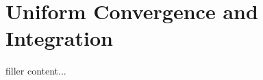 \section{Uniform Convergence and Integration}\label{sec:uniform-convergence-and-integration}

filler content...

